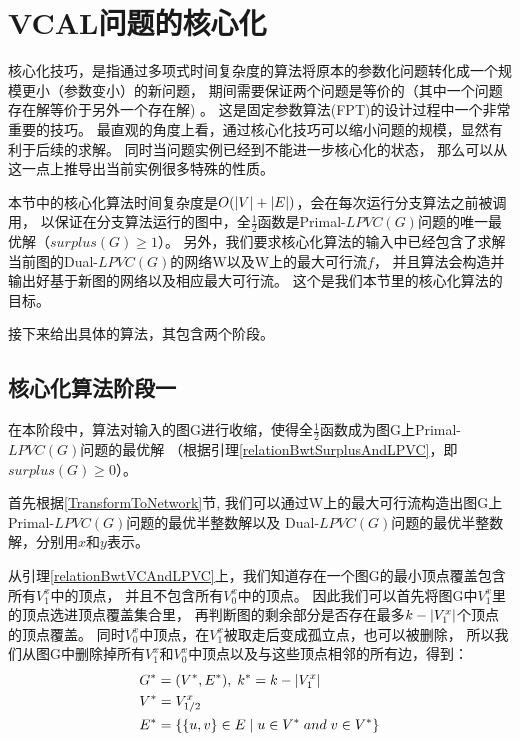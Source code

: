 

\section{VCAL问题的核心化} \label{KerneliseAlgorithm}
核心化技巧，是指通过多项式时间复杂度的算法将原本的参数化问题转化成一个规模更小（参数变小）的新问题，
期间需要保证两个问题是等价的（其中一个问题存在解等价于另外一个存在解) 。
这是固定参数算法(FPT)的设计过程中一个非常重要的技巧。
最直观的角度上看，通过核心化技巧可以缩小问题的规模，显然有利于后续的求解。
同时当问题实例已经到不能进一步核心化的状态，
那么可以从这一点上推导出当前实例很多特殊的性质。

本节中的核心化算法时间复杂度是$O(\left\vert V \right\vert + \left\vert E \right\vert)$，会在每次运行分支算法之前被调用，
以保证在分支算法运行的图中，全$\frac{1}{2}$函数是Primal-$LPVC(G)$问题的唯一最优解（$surplus(G) \ge 1$）。
另外，我们要求核心化算法的输入中已经包含了求解当前图的Dual-$LPVC(G)$的网络W以及W上的最大可行流$f$，
并且算法会构造并输出好基于新图的网络以及相应最大可行流。
这个是我们本节里的核心化算法的目标。

接下来给出具体的算法，其包含两个阶段。

\subsection{核心化算法阶段一}
在本阶段中，算法对输入的图G进行收缩，使得全$\frac{1}{2}$函数成为图G上Primal-$LPVC(G)$问题的最优解
（根据引理\ref{relationBwtSurplusAndLPVC}，即$surplus(G) \ge 0$）。
\vspace{0.5cm}

首先根据\ref{TransformToNetwork}节, 我们可以通过W上的最大可行流构造出图G上Primal-$LPVC(G)$问题的最优半整数解以及
Dual-$LPVC(G)$问题的最优半整数解，分别用$x$和$y$表示。

从引理\ref{relationBwtVCAndLPVC}上，我们知道存在一个图G的最小顶点覆盖包含所有$V^x_1$中的顶点，
并且不包含所有$V^x_0$中的顶点。
因此我们可以首先将图G中$V^x_1$里的顶点选进顶点覆盖集合里，
再判断图的剩余部分是否存在最多$k - \left\vert V^x_1 \right\vert$个顶点的顶点覆盖。
同时$V^x_0$中顶点，在$V^x_1$被取走后变成孤立点，也可以被删除，
所以我们从图G中删除掉所有$V^x_1$和$V^x_0$中顶点以及与这些顶点相邻的所有边，得到：
\begin{equation*}\begin{aligned}
    &G^* = (V^*, E^*),\;k^* = k - \left\vert V^x_1 \right\vert \\
    &V^* = V^x_{1/2} \\
    &E^* = \{\{u, v\} \in E\;|\;u \in V^*\;and\;v\in V^*\}
\end{aligned}\end{equation*}

